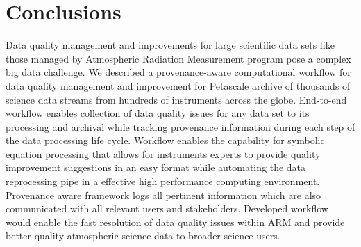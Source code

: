 \section{Conclusions}
Data quality management and improvements for large scientific data sets
like those managed by Atmospheric Radiation Measurement program pose a
complex big data challenge. We described a provenance-aware
computational workflow for data quality management and improvement for 
Petascale archive of thousands of science data streams from hundreds of
instruments across the globe. End-to-end workflow enables collection of
data quality issues for any data set to its processing and archival
while tracking provenance information during each step of the data
processing life cycle. Workflow enables the capability for symbolic
equation processing that allows for instruments experts to provide
quality improvement suggestions in an easy format while automating the
data reprocessing pipe in a effective high performance computing environment. 
Provenance aware framework logs all pertinent information which are also
communicated with all relevant users and stakeholders. Developed
workflow would enable the fast resolution of data quality issues within
ARM and provide better quality atmospheric science data to broader
science users.
